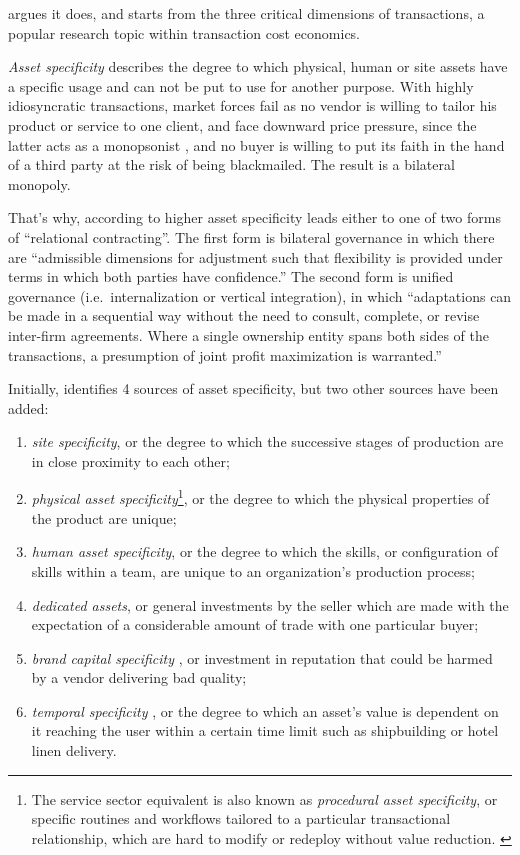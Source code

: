 \documentclass[12pt]{article}
\providecommand{\tightlist}{%
  \setlength{\itemsep}{0pt}\setlength{\parskip}{0pt}}
\begin{document}
\citet[37-44]{canback1998} argues it does, and starts from the three
critical dimensions of transactions, a popular research topic within
transaction cost economics.

\emph{Asset specificity} describes the degree to which physical, human
or site assets have a specific usage and can not be put to use for
another purpose. With highly idiosyncratic transactions, market forces
fail as no vendor is willing to tailor his product or service to one
client, and face downward price pressure, since the latter acts as a
monopsonist \citep[ 218-228]{robinson1969}, and no buyer is willing to
put its faith in the hand of a third party at the risk of being
blackmailed. The result is a bilateral monopoly. \citep[
63]{williamson1985}

That's why, according to \citet[250-253]{williamson1979} higher asset
specificity leads either to one of two forms of ``relational
contracting''. The first form is bilateral governance in which there are
``admissible dimensions for adjustment such that flexibility is provided
under terms in which both parties have confidence.'' The second form is
unified governance (i.e.~internalization or vertical integration), in
which ``adaptations can be made in a sequential way without the need to
consult, complete, or revise inter-firm agreements. Where a single
ownership entity spans both sides of the transactions, a presumption of
joint profit maximization is warranted.''

Initially, \citet[95-96]{williamson1985} identifies 4 sources of asset
specificity, but two other sources have been added:

\begin{enumerate}
\def\labelenumi{\arabic{enumi}.}
\tightlist
\item
  \emph{site specificity}, or the degree to which the successive stages
  of production are in close proximity to each other;
\item
  \emph{physical asset specificity}\footnote{The service sector
    equivalent is also known as \emph{procedural asset specificity}, or
    specific routines and workflows tailored to a particular
    transactional relationship, which are hard to modify or redeploy
    without value reduction. \citep{zaheer1995}}, or the degree to which
  the physical properties of the product are unique;
\item
  \emph{human asset specificity}, or the degree to which the skills, or
  configuration of skills within a team, are unique to an organization's
  production process;
\item
  \emph{dedicated assets}, or general investments by the seller which
  are made with the expectation of a considerable amount of trade with
  one particular buyer;
\item
  \emph{brand capital specificity} \citep[ 335]{vita2011}, or investment
  in reputation that could be harmed by a vendor delivering bad quality;
\item
  \emph{temporal specificity} \citep[ 486]{malone1987}, or the degree to
  which an asset's value is dependent on it reaching the user within a
  certain time limit such as shipbuilding or hotel linen delivery.
\end{enumerate}
\end{document}
